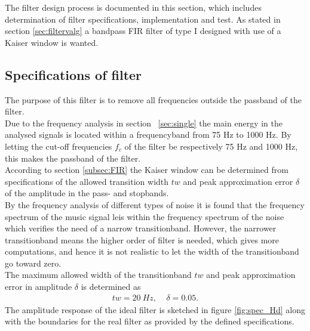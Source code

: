 The filter design process is documented in this section, which includes determination of filter specifications, implementation and test. As stated in section \ref{sec:filtervalg} a bandpass FIR filter of type I designed with use of a Kaiser window is wanted.

\subsection{Specifications of filter} \label{sec:FIRspec} 
The purpose of this filter is to remove all frequencies outside the passband of the filter.  \\
Due to the frequency analysis in section ~\ref{sec:single} the main energy in the analysed signals is located within a frequencyband from 75 Hz to 1000 Hz.  
By letting the cut-off frequencies $f_c$ of the filter be respectively 75 Hz and 1000 Hz, this makes the passband of the filter. \\ 
According to section \ref{subsec:FIR} the Kaiser window can be determined from specifications of the allowed transition width $tw$ and peak approximation error $\delta$ of the amplitude in the pass- and stopbands. \\ 
By the frequency analysis of different types of noise it is found that the frequency spectrum of the music signal leis within the frequency spectrum of the noise which verifies the need of a narrow transitionband. However, the narrower transitionband means the higher order of filter is needed, which gives more computations, and hence it is not realistic to let the width of the transitionband go toward zero.  \\
The maximum allowed width of the transitionband $tw$ and peak approximation error in amplitude $\delta$ is determined as
\begin{align}
tw = 20 \ Hz, \ \ \ \ \  \delta = 0.05. 
\end{align}
The amplitude response of the ideal filter is sketched in figure \ref{fig:spec_Hd} along with the boundaries for the real filter as provided by the defined specifications.      

